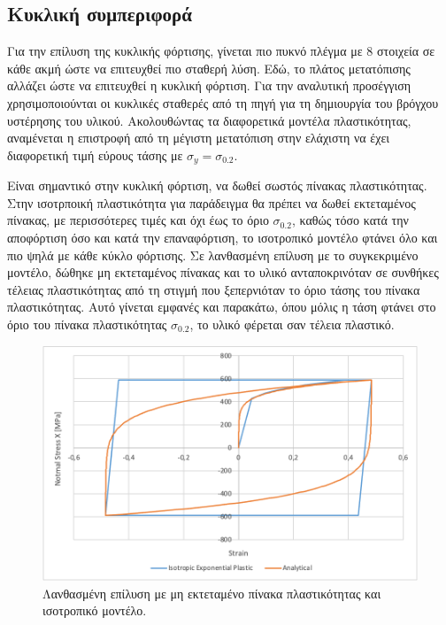 \documentclass{article}
\begin{document}
\subsection{Κυκλική συμπεριφορά}
Για την επίλυση της κυκλικής φόρτισης, γίνεται πιο πυκνό πλέγμα με 8 στοιχεία σε κάθε ακμή ώστε να επιτευχθεί πιο σταθερή λύση. Εδώ, το πλάτος μετατόπισης αλλάζει ώστε να επιτευχθεί η κυκλική φόρτιση. Για την αναλυτική προσέγγιση χρησιμοποιούνται οι κυκλικές σταθερές από τη πηγή για τη δημιουργία του βρόγχου υστέρησης του υλικού. Ακολουθώντας τα διαφορετικά μοντέλα πλαστικότητας, αναμένεται η επιστροφή από τη μέγιστη μετατόπιση στην ελάχιστη να έχει διαφορετική τιμή εύρους τάσης με $\sigma_y = \sigma_{0.2}$. 
\par Είναι σημαντικό στην κυκλική φόρτιση, να δωθεί σωστός πίνακας πλαστικότητας. Στην ισοτρποική πλαστικότητα για παράδειγμα θα πρέπει να δωθεί εκτεταμένος πίνακας, με περισσότερες τιμές και όχι έως το όριο $\sigma_{0.2}$, καθώς τόσο κατά την αποφόρτιση όσο και κατά την επαναφόρτιση, το ισοτροπικό μοντέλο φτάνει όλο και πιο ψηλά με κάθε κύκλο φόρτισης. Σε λανθασμένη επίλυση με το συγκεκριμένο μοντέλο, δώθηκε μη εκτεταμένος πίνακας και το υλικό ανταποκρινόταν σε συνθήκες τέλειας πλαστικότητας από τη στιγμή που ξεπερνιόταν το όριο τάσης του πίνακα πλαστικότητας. Αυτό γίνεται εμφανές και παρακάτω, όπου μόλις η τάση φτάνει στο όριο του πίνακα πλαστικότητας $\sigma_{0.2}$, το υλικό φέρεται σαν τέλεια πλαστικό.
\begin{figure}[H]
    \centering
    \includegraphics[width=0.8\linewidth]{media/dynamic-false.png}
    \caption{Λανθασμένη επίλυση με μη εκτεταμένο πίνακα πλαστικότητας και ισοτροπικό μοντέλο.}
    \label{fig:dfalse}
\end{figure}
\end{document}
